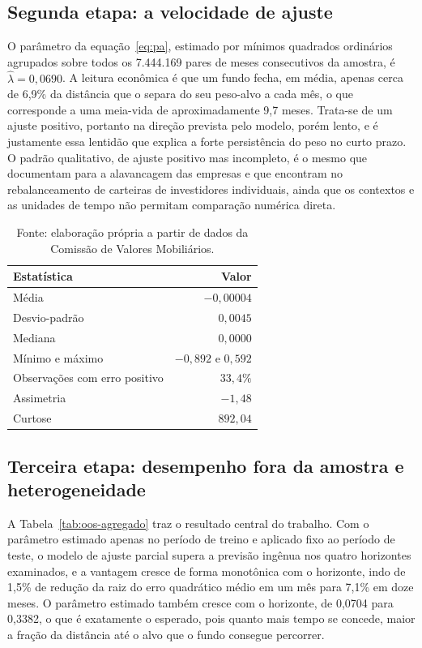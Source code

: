 \documentclass[12pt,a4paper]{article}
\begin{document}
\FloatBarrier
\subsection{Segunda etapa: a velocidade de ajuste}

O parâmetro da equação~\eqref{eq:pa}, estimado por mínimos quadrados ordinários agrupados
sobre todos os 7.444.169 pares de meses consecutivos da amostra, é $\widehat\lambda =
0{,}0690$. A leitura econômica é que um fundo fecha, em média, apenas cerca de 6,9\% da
distância que o separa do seu peso-alvo a cada mês, o que corresponde a uma meia-vida de
aproximadamente 9,7 meses. Trata-se de um ajuste positivo, portanto na direção prevista pelo
modelo, porém lento, e é justamente essa lentidão que explica a forte persistência do peso no
curto prazo. O padrão qualitativo, de ajuste positivo mas incompleto, é o mesmo que
 documentam para a alavancagem das empresas e que
 encontram no rebalanceamento de carteiras de investidores
individuais, ainda que os contextos e as unidades de tempo não permitam comparação numérica
direta.

\begin{table}[h]\centering\small
\caption{Estatísticas do erro da segunda etapa, em 7.444.169 pares de meses consecutivos.}
\label{tab:erro-u}
\begin{tabular}{@{}lr@{}}
\toprule
Estatística & Valor \\
\midrule
Média & $-0{,}00004$ \\
Desvio-padrão & $0{,}0045$ \\
Mediana & $0{,}0000$ \\
Mínimo e máximo & $-0{,}892$ e $0{,}592$ \\
Observações com erro positivo & $33{,}4\%$ \\
Assimetria & $-1{,}48$ \\
Curtose & $892{,}04$ \\
\bottomrule
\end{tabular}
\caption*{\footnotesize Fonte: elaboração própria a partir de dados da Comissão de Valores
Mobiliários.}
\end{table}

\FloatBarrier
\subsection{Terceira etapa: desempenho fora da amostra e heterogeneidade}

A Tabela~\ref{tab:oos-agregado} traz o resultado central do trabalho. Com o parâmetro
estimado apenas no período de treino e aplicado fixo ao período de teste, o modelo de ajuste
parcial supera a previsão ingênua nos quatro horizontes examinados, e a vantagem cresce de
forma monotônica com o horizonte, indo de 1,5\% de redução da raiz do erro quadrático médio
em um mês para 7,1\% em doze meses. O parâmetro estimado também cresce com o horizonte, de
0,0704 para 0,3382, o que é exatamente o esperado, pois quanto mais tempo se concede, maior a
fração da distância até o alvo que o fundo consegue percorrer.
\end{document}
